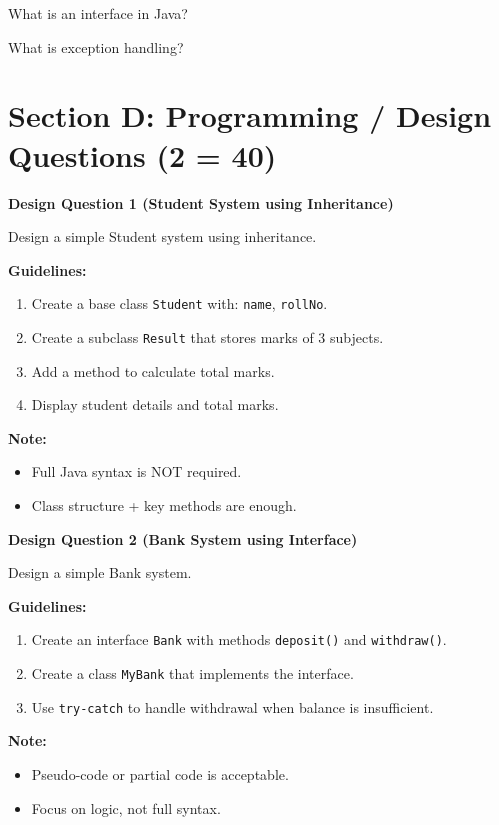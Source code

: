 \documentclass{CWNUExam}
\begin{document}
\begin{problem}
What is an interface in Java?
\end{problem}

\begin{problem}
What is exception handling?
\end{problem}

\section{Section D: Programming / Design Questions (2  = 40)}

\begin{problem}
    \textbf{Design Question 1 (Student System using Inheritance)}
    
    Design a simple Student system using inheritance.
    
    \textbf{Guidelines:}
    \begin{enumerate}
      \item Create a base class \texttt{Student} with: \texttt{name}, \texttt{rollNo}.
      \item Create a subclass \texttt{Result} that stores marks of 3 subjects.
      \item Add a method to calculate total marks.
      \item Display student details and total marks.
    \end{enumerate}
    
    \textbf{Note:}
    \begin{itemize}
      \item Full Java syntax is NOT required.
      \item Class structure + key methods are enough.
    \end{itemize}
    \end{problem}
    

    \begin{problem}
        \textbf{Design Question 2 (Bank System using Interface)}
        
        Design a simple Bank system.
        
        \textbf{Guidelines:}
        \begin{enumerate}
          \item Create an interface \texttt{Bank} with methods \texttt{deposit()} and \texttt{withdraw()}.
          \item Create a class \texttt{MyBank} that implements the interface.
          \item Use \texttt{try-catch} to handle withdrawal when balance is insufficient.
        \end{enumerate}
        
        \textbf{Note:}
        \begin{itemize}
          \item Pseudo-code or partial code is acceptable.
          \item Focus on logic, not full syntax.
        \end{itemize}
        \end{problem}
        
\end{document}
